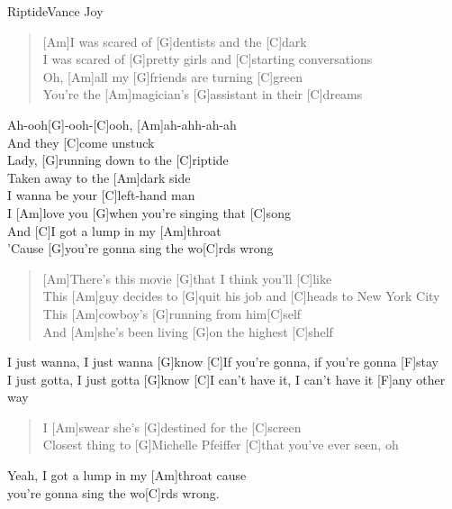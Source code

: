\begin{song}{Riptide}{Vance Joy}

    \begin{verse}  
        [Am]I was scared of [G]dentists and the [C]dark \\
        [Am]I was scared of [G]pretty girls and [C]starting conversations \\
        Oh, [Am]all my [G]friends are turning [C]green \\
        You're the [Am]magician's [G]assistant in their [C]dreams
    \end{verse}  

    \begin{chorus}
        [Am]Ah-ooh[G]-ooh-[C]ooh, [Am]ah-ahh-ah-ah \\
        [G]And they [C]come unstuck \\
        [Am]Lady, [G]running down to the [C]riptide \\
        [C]Taken away to the [Am]dark side \\
        [G]I wanna be your [C]left-hand man \\
        I [Am]love you [G]when you're singing that [C]song \\
        And [C]I got a lump in my [Am]throat \\
        'Cause [G]you're gonna sing the wo[C]rds wrong
    \end{chorus}

    \begin{verse}  
        [Am]There's this movie [G]that I think you'll [C]like \\
        This [Am]guy decides to [G]quit his job and [C]heads to New York City \\
        This [Am]cowboy's [G]running from him[C]self \\
        And [Am]she's been living [G]on the highest [C]shelf
    \end{verse}  

    \begin{bridge}  
       [Am]I just wanna, I just wanna [G]know [C]If you're gonna, if you're gonna [F]stay \\
       [Am]I just gotta, I just gotta [G]know [C]I can't have it, I can't have it [F]any other way
    \end{bridge}  
       
    \begin{verse}  
       I [Am]swear she's [G]destined for the [C]screen \\
       [Am]Closest thing to [G]Michelle Pfeiffer [C]that you've ever seen, oh
    \end{verse}  


    \begin{outro}  
        [C]Yeah, I got a lump in my [Am]throat cause \\
        [G]you're gonna sing the wo[C]rds wrong.
    \end{outro}  

\end{song}

